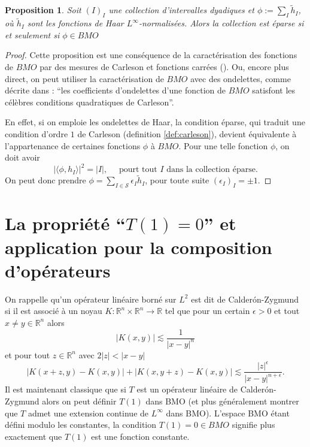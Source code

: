 \documentclass[11pt]{amsart}
\newtheorem{proposition}[theorem]{Proposition}
\newcommand{\rr}{\mathbb}
\newcommand{\ic}{\mathcal}
\begin{document}
\begin{proposition} Soit $(I)_I$ une collection d'intervalles dyadiques et $\phi:= \sum_{I} \tilde h_I$, o\`u $\tilde h_I$ sont les fonctions de Haar $L^\infty$-normalis\'ees. Alors la collection est \'eparse si et seulement si $\phi \in BMO$
\end{proposition}

\begin{proof}
Cette proposition est une cons\'equence de la caract\'erisation des fonctions de $BMO$ par des mesures de Carleson et fonctions carr\'ees (\cite[Th\'eor\`eme 3 page 159]{SteinBigBook}). Ou, encore plus direct, on peut utiliser la caract\'erisation de $BMO$ avec des ondelettes, comme d\'ecrite dans \cite{Yves-ondelettes}: ``les coefficients d'ondelettes d'une fonction de $BMO$ satisfont les c\'el\`ebres conditions quadratiques de Carleson''. 

En effet, si on emploie les ondelettes de Haar, la condition \'eparse, qui traduit une condition d'ordre $1$ de Carleson (definition \ref{def:carleson}), devient \'equivalente \`a l'appartenance de certaines fonctions $\phi$ \`a $BMO$. Pour une telle fonction $\phi$, on doit avoir
\[
\vert \langle \phi, h_I \rangle \vert ^2 = \vert I \vert, \quad \text{ pourt tout $I$ dans la collection \'eparse}.
\]
On peut donc prendre $\phi=\sum_{I \in \ic S} \epsilon_I \tilde h_I$, pour toute suite $(\epsilon_I)_I = \pm 1$.


\end{proof}







\section{La propri\'et\'e ``$T(1)=0$'' et application pour la composition d'op\'erateurs} \label{sec:T1=0}

On rappelle qu'un op\'erateur lin\'eaire born\'e sur $L^2$ est dit de Calder\'on-Zygmund si il est associ\'e \`a un noyau $K:{\rr R}^n \times {\rr R}^n \rightarrow {\rr R}$ tel que pour un certain $\epsilon>0$ et tout $x\neq y \in{\rr R}^n$ alors
$$ |K(x,y)| \lesssim \frac{1}{|x-y|^{n}}$$
et pour tout $z\in {\rr R}^n$ avec $2|z|<|x-y|$
$$  |K(x+z,y)-K(x,y)|  + |K(x,y+z)-K(x,y)| \lesssim \frac{|z|^\epsilon}{|x-y|^{n+\epsilon}}.$$
Il est maintenant classique que si $T$ est un op\'erateur lin\'eaire de Calder\'on-Zygmund alors on peut d\'efinir $T(1)$ dans BMO (et plus g\'en\'eralement montrer que $T$ admet une extension continue de $L^\infty$ dans BMO). L'espace BMO \'etant d\'efini modulo les constantes, la condition $T(1)=0\in BMO$ signifie plus exactement que $T(1)$ est une fonction constante.
\end{document}
